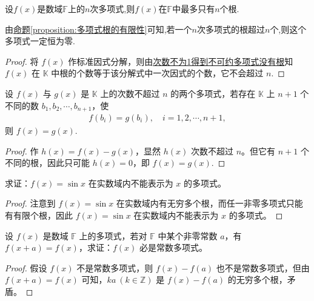 \documentclass[../../main.tex]{subfiles}%
\begin{document}
\begin{theorem}[多项式根的有限性]\label{theorem:多项式根的有限性}
设\(f(x)\)是数域\(\mathbb{F}\)上的\(n\)次多项式,则\(f(x)\)在\(\mathbb{F}\)中最多只有\(n\)个根.
\end{theorem}
\begin{note}
由\hyperref[proposition:多项式根的有限性]{命题\ref{proposition:多项式根的有限性}}可知,若一个$n$次多项式的根超过$n$个,则这个多项式一定恒为零.
\end{note}
\begin{proof}
将 $f(x)$ 作标准因式分解，则由\hyperref[lemma:次数不为1得到不可约多项式没有根]{次数不为1得到不可约多项式没有根}知 $f(x)$ 在 $\mathbb{K}$ 中根的个数等于该分解式中一次因式的个数，它不会超过 $n$.
\end{proof}

\begin{corollary}[两个多项式相等的判定准则]\label{corollary:两个多项式相等的判定准则}
设 $f(x)$ 与 $g(x)$ 是 $\mathbb{K}$ 上的次数不超过 $n$ 的两个多项式，若存在 $\mathbb{K}$ 上 $n + 1$ 个不同的数 $b_1, b_2, \cdots, b_{n+1}$，使
\begin{align*}
f(b_i) = g(b_i), \quad i = 1, 2, \cdots, n + 1,
\end{align*}
则 $f(x) = g(x)$.
\end{corollary}
\begin{proof}
作 $h(x) = f(x) - g(x)$，显然 $h(x)$ 次数不超过 $n$。但它有 $n + 1$ 个不同的根，因此只可能 $h(x) = 0$，即 $f(x) = g(x)$.
\end{proof}

\begin{example}
求证：$f(x) = \sin x$ 在实数域内不能表示为 $x$ 的多项式。
\end{example}
\begin{proof}
注意到 $f(x) = \sin x$ 在实数域内有无穷多个根，而任一非零多项式只能有有限个根，因此 $f(x) = \sin x$ 在实数域内不能表示为 $x$ 的多项式。
\end{proof}

\begin{example}
设 $f(x)$ 是数域 $\mathbb{F}$ 上的多项式，若对 $\mathbb{F}$ 中某个非零常数 $a$，有 $f(x + a) = f(x)$，求证：$f(x)$ 必是常数多项式。
\end{example}
\begin{proof}
假设 $f(x)$ 不是常数多项式，则 $f(x) - f(a)$ 也不是常数多项式，但由 $f(x + a) = f(x)$ 可知，$ka \ (k \in \mathbb{Z})$ 是 $f(x) - f(a)$ 的无穷多个根，矛盾。
\end{proof}
\end{document}
